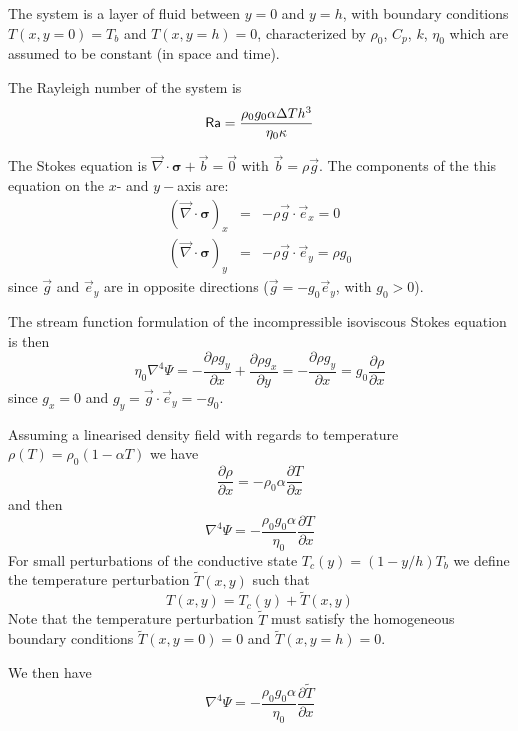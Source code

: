

The system is a layer of fluid between $y=0$ and $y=h$, with boundary conditions $T(x,y=0)=T_b$ 
and $T(x,y=h)=0$, characterized by $\rho_0$, $C_p$, $k$, $\eta_0$ which are assumed to be constant
(in space and time). 

The Rayleigh number of the system is 
\[
{\mathsf{Ra}}= \frac{\rho_0 g_0 \alpha \Delta T h^3}{\eta_0 \kappa}
\]

The Stokes equation is $\vec \nabla \cdot \bm \sigma + \vec b = \vec 0$ with $\vec b=\rho \vec g$. 
The components of the this equation on the $x$- and $y-$axis are:
\begin{eqnarray}
(\vec \nabla \cdot \bm \sigma)_x &=& - \rho \vec g \cdot \vec e_x = 0\\ 
(\vec \nabla \cdot \bm \sigma)_y &=& - \rho \vec g \cdot \vec e_y = \rho g_0
\end{eqnarray}
since $\vec g$ and $\vec e_y$ are in opposite directions ($\vec g = - g_0 \vec e_y$, with $g_0>0$).

The stream function formulation of the incompressible isoviscous Stokes equation is then
\[
\eta_0 \nabla^4 \Psi
= -\frac{\partial \rho g_y}{\partial x} + \frac{\partial \rho g_x}{\partial y}   
= -\frac{\partial \rho g_y}{\partial x} 
=  g_0 \frac{\partial \rho}{\partial x} 
\]
since $g_x=0$ and $g_y=\vec{g}\cdot\vec{e}_y=-g_0$.

Assuming a linearised density field with regards to temperature $\rho(T)=\rho_0 (1-\alpha T)$
we have 
\[
\frac{\partial \rho}{\partial x} 
=
-\rho_0 \alpha \frac{\partial T}{\partial x} 
\]
and then 
\begin{equation}
\nabla^4 \Psi= -\frac{\rho_0 g_0 \alpha}{\eta_0} \frac{\partial T}{\partial x} 
\end{equation}
For small perturbations of the conductive state $T_c(y)=(1-y/h)T_b$ 
we define the temperature perturbation $\tilde{T}(x,y)$ such that 
\[
T(x,y)=T_c(y)+\tilde{T}(x,y)
\]
Note that the temperature perturbation $\tilde{T}$ must satisfy the homogeneous boundary 
conditions $\tilde{T}(x,y=0)=0$ and $\tilde{T}(x,y=h)=0$.

We then have 
\[
\boxed{
\nabla^4 \Psi= -\frac{\rho_0 g_0 \alpha}{\eta_0} \frac{\partial \tilde{T}}{\partial x} 
}
\]


